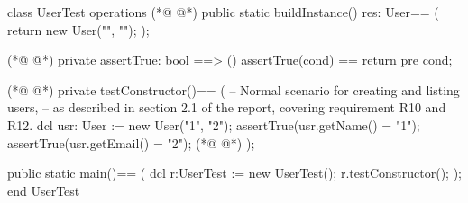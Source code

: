 \begin{vdmpp}[breaklines=true]
class UserTest
 operations
(*@
\label{buildInstance:3}
@*)
  public static buildInstance() res: User==
  (
   return new User("", "");
  );
  
(*@
\label{assertTrue:8}
@*)
  private assertTrue: bool ==> ()
    assertTrue(cond) == return
    pre cond;
    
(*@
\label{testConstructor:12}
@*)
  private testConstructor()==
  (
    -- Normal scenario for creating and listing users,
     -- as described in section 2.1 of the report, covering requirement R10 and R12.
   dcl usr: User := new User("1", "2");
   assertTrue(usr.getName() = "1");
   assertTrue(usr.getEmail() = "2");
(*@
\label{main:19}
@*)
  );
  
  public static main()==
    (
   dcl r:UserTest := new UserTest();
   r.testConstructor();
    );
end UserTest
\end{vdmpp}
